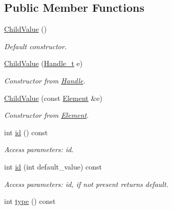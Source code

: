 \subsection*{Public Member Functions}
\begin{DoxyCompactItemize}
\item 
\hyperlink{struct_d_d4hep_1_1_x_m_l_1_1_child_value_aa23bcc094d5069317c5e0dba4e0007ce}{ChildValue} ()
\begin{DoxyCompactList}\small\item\em Default constructor. \item\end{DoxyCompactList}\item 
\hyperlink{struct_d_d4hep_1_1_x_m_l_1_1_child_value_af223fea6d4d6b08ac0cb655f22e8e2b0}{ChildValue} (\hyperlink{class_d_d4hep_1_1_x_m_l_1_1_handle__t}{Handle\_\-t} e)
\begin{DoxyCompactList}\small\item\em Constructor from \hyperlink{class_d_d4hep_1_1_handle}{Handle}. \item\end{DoxyCompactList}\item 
\hyperlink{struct_d_d4hep_1_1_x_m_l_1_1_child_value_a1295821eee0759c3d9617408b40aedac}{ChildValue} (const \hyperlink{class_d_d4hep_1_1_x_m_l_1_1_element}{Element} \&e)
\begin{DoxyCompactList}\small\item\em Constructor from \hyperlink{class_d_d4hep_1_1_x_m_l_1_1_element}{Element}. \item\end{DoxyCompactList}\item 
int \hyperlink{struct_d_d4hep_1_1_x_m_l_1_1_child_value_a78728826dc0038a5336ad45a39616d64}{id} () const 
\begin{DoxyCompactList}\small\item\em Access parameters: id. \item\end{DoxyCompactList}\item 
int \hyperlink{struct_d_d4hep_1_1_x_m_l_1_1_child_value_a782a7165d038e4b840d5f94b36112e5c}{id} (int default\_\-value) const 
\begin{DoxyCompactList}\small\item\em Access parameters: id, if not present returns default. \item\end{DoxyCompactList}\item 
int \hyperlink{struct_d_d4hep_1_1_x_m_l_1_1_child_value_aee3e2b048dccfdd1fa8c139e12763c36}{type} () const 

\end{DoxyCompactItemize}
